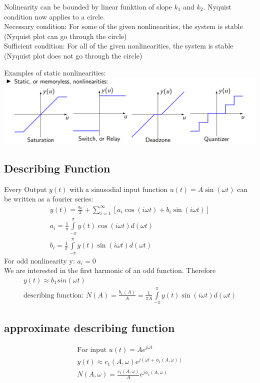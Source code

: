 Nolinearity can be bounded by linear funktion of slope $k_1$ and $k_2$. Nyquist condition now applies to a circle.\\
Necessary condition: For some of the given nonlinearities, the system is stable (Nyquist plot can go through the circle)\\
Sufficient condition: For all of the given nonlinearities, the system is stable (Nyquist plot does not go through the circle)

Examples of static nonlinearities:
\includegraphics[width = \linewidth]{src/images/nonlinearity_example.png}

\subsection{Describing Function}
    Every Output $y(t)$ with a sinusodial input function $u(t) = A \sin(\omega t)$ can be written as a fourier series:
    \begin{align*}
        y(t) = \frac{a_0}{2} + \sum\limits_{i = 1}^{\infty}[a_i \cos(i \omega t) + b_i \sin(i \omega t)]\\
        a_i = \frac{1}{\pi} \int\limits_{-\pi}^{\pi} y(t) \cos(i \omega t) d(\omega t)\\
        b_i = \frac{1}{\pi} \int\limits_{-\pi}^{\pi} y(t) \sin(i \omega t) d(\omega t)
    \end{align*}
    For odd nonlinearity y: $a_i = 0$\\
    We are interested in the first harmonic of an odd function. Therefore 
    \begin{align*}
        y(t) \approx b_1 sin(\omega t)\\
        \text{describing function: } N(A) = \frac{b_1(A)}{A} = \frac{1}{\pi A} \int\limits_{-\pi}^{\pi} y(t) \sin(i \omega t) d(\omega t)
    \end{align*}

\subsection{approximate describing function}
    \begin{align*}
        \text{For input } u(t) = Ae^{j \omega t}\\
        y(t) \approx c_1(A, \omega) e^{j(\omega t + \phi_1(A, \omega))}\\
        N(A, \omega) = \frac{c_1(A, \omega)}{A} e^{j \phi_1(A, \omega)}
    \end{align*}

